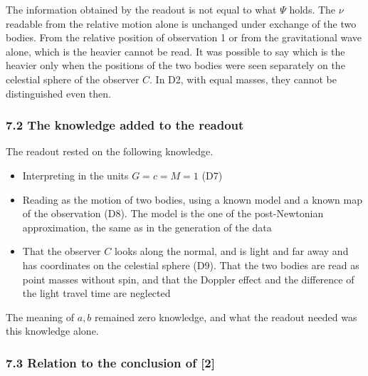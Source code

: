 \documentclass[
  a4paper,
]{article}
\providecommand{\tightlist}{%
  \setlength{\itemsep}{0pt}\setlength{\parskip}{0pt}}
\begin{document}
The information obtained by the readout is not equal to what \(\Psi\)
holds. The \(\nu\) readable from the relative motion alone is unchanged
under exchange of the two bodies. From the relative position of
observation 1 or from the gravitational wave alone, which is the heavier
cannot be read. It was possible to say which is the heavier only when
the positions of the two bodies were seen separately on the celestial
sphere of the observer \(C\). In D2, with equal masses, they cannot be
distinguished even then.

\subsubsection{7.2 The knowledge added to the
readout}\label{the-knowledge-added-to-the-readout}

The readout rested on the following knowledge.

\begin{itemize}
\tightlist
\item
  Interpreting in the units \(G=c=M=1\) (D7)
\item
  Reading as the motion of two bodies, using a known model and a known
  map of the observation (D8). The model is the one of the
  post-Newtonian approximation, the same as in the generation of the
  data
\item
  That the observer \(C\) looks along the normal, and is light and far
  away and has coordinates on the celestial sphere (D9). That the two
  bodies are read as point masses without spin, and that the Doppler
  effect and the difference of the light travel time are neglected
\end{itemize}

The meaning of \(a, b\) remained zero knowledge, and what the readout
needed was this knowledge alone.

\subsubsection{7.3 Relation to the conclusion of
{[}2{]}}\label{relation-to-the-conclusion-of-2}
\end{document}
